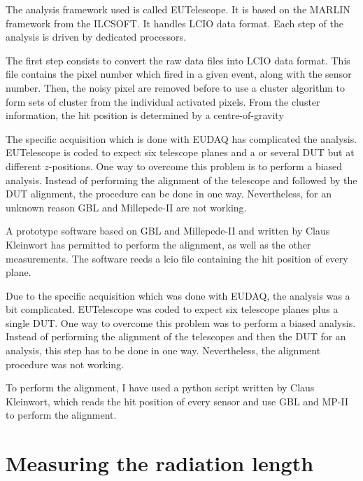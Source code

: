     The analysis framework used is called EUTelescope.
    It is based on the MARLIN framework from the ILCSOFT.
    It handles LCIO data format.
    Each step of the analysis is driven by dedicated processors.

    The first step consists to convert the raw data files into LCIO data format.
    This file contains the pixel number which fired in a given event, along with the sensor number.
    Then, the noisy pixel are removed before to use a cluster algorithm to form sets of cluster from the individual activated pixels.
    From the cluster information, the hit position is determined by a centre-of-gravity 

    The specific acquisition which is done with EUDAQ has complicated the analysis.
    EUTelescope is coded to expect six telescope planes and a or several \gls{DUT} but at different $z$-positions.
    One way to overcome this problem is to perform a biased analysis. 
    Instead of performing the alignment of the telescope and followed by the \gls{DUT} alignment, the procedure can be done in one way.
    Nevertheless, for an unknown reason GBL and Millepede-II are not working.

    A prototype software based on GBL and Millepede-II and written by Claus Kleinwort has permitted to perform the alignment, as well as the other measurements.
    The software reeds a lcio file containing the hit position of every plane.

    Due to the specific acquisition which was done with EUDAQ, the analysis was a bit complicated.
    EUTelescope was coded to expect six telescope planes plus a single DUT.
    One way to overcome this problem was to perform a biased analysis.
    Instead of performing the alignment of the telescopes and then the DUT for an analysis, this step has to be done in one way.
    Nevertheless, the alignment procedure was not working.

    To perform the alignment, I have used a python script written by Claus Kleinwort, which reads the hit position of every sensor and use GBL and MP-II to perform the alignment.


  \section{Measuring the radiation length}

